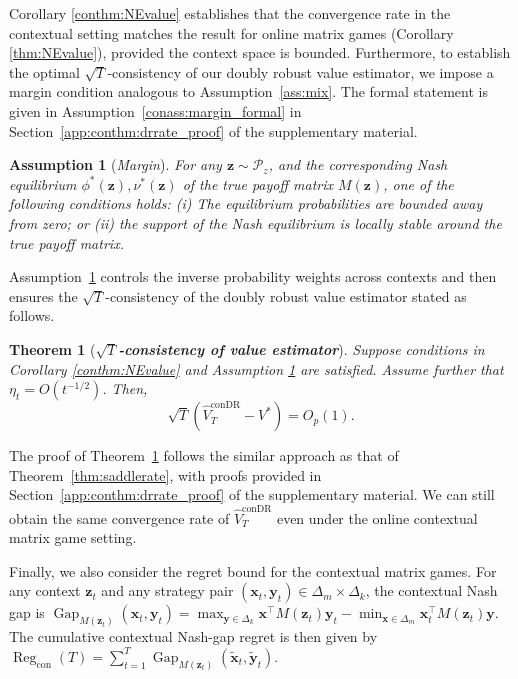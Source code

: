 \documentclass[12pt]{article}
\newtheorem{theorem}{Theorem}
\newtheorem{assumption}{Assumption}[section]
\begin{document}
Corollary \ref{conthm:NEvalue} establishes that the convergence rate in the contextual setting matches the result for online matrix games (Corollary \ref{thm:NEvalue}), provided the context space is bounded. 
Furthermore, to establish the optimal $\sqrt{T}$-consistency of our doubly robust value estimator, we impose a margin condition analogous to Assumption~\ref{ass:mix}. The formal statement is given in Assumption~\ref{conass:margin_formal} in Section~\ref{app:conthm:drrate_proof} of the supplementary material.



\begin{assumption}[\emph{Margin}]
    \label{conass:margin}
    For any $\bm{z} \sim \mathcal{P}_z$, and the corresponding Nash equilibrium $\phi^\ast(\bm z), \nu^\ast(\bm z)$ of the true payoff matrix $M(\bm z)$, one of the following conditions holds: 
    \textnormal{(i)} The equilibrium probabilities are bounded away from zero; or 
\textnormal{(ii)} the support of the Nash equilibrium is locally stable around the true payoff matrix. 
\end{assumption}

Assumption~\ref{conass:margin} controls the inverse probability weights across contexts and then ensures the $\sqrt{T}$-consistency of the doubly robust value estimator stated as follows. 

\begin{theorem}[\textbf{{\emph{$\sqrt{T}$-consistency of value estimator}}}]
\label{conthm:drrate}
Suppose conditions in Corollary \ref{conthm:NEvalue} and Assumption \ref{conass:margin} are satisfied. Assume further that $\eta_t = O(t^{-1/2})$. Then, 
\begin{equation*}
        \sqrt{T} \left(\widehat{V}_T^{\text{conDR}}- V^\ast \right) = O_p(1).
    \end{equation*}
\end{theorem}
The proof of Theorem~\ref{conthm:drrate} follows the similar approach as that of Theorem~\ref{thm:saddlerate}, with proofs provided in Section~\ref{app:conthm:drrate_proof} of the supplementary material. We can still obtain the same convergence rate of $\widehat{V}_T^{\text{conDR}}$ even under the online contextual matrix game setting.

Finally, we also consider the regret bound for the contextual matrix games. For any context $\bm z_t$ and any strategy pair $(\bm x_t,\bm y_t)\in\Delta_m\times\Delta_k$, the
contextual Nash gap is $\operatorname{Gap}_{M(\bm z_t)} (\bm x_t,\bm y_t)=\max_{\bm y\in\Delta_k}\bm x^\top M(\bm z_t)\bm y_t-\min_{\bm x\in\Delta_m}\bm x_t^\top M(\bm z_t)\bm y$. The cumulative contextual Nash-gap regret is then given by $\operatorname{Reg}_{\mathrm{con}}(T)=\sum_{t=1}^T\operatorname{Gap}_{M(\bm z_t)}\left(\widetilde{\bm x}_t,\widetilde{\bm y}_t \right)$.
\end{document}
